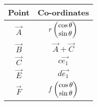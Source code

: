 \begin{tabular}{|c|c|}
\hline
Point & Co-ordinates\\
\hline
$\vec{A}$ & $r\begin{pmatrix}\cos{\theta}\\\sin{\theta}\end{pmatrix}$ \\
\hline
$\vec{B}$ & $\vec{A} + \vec{C}$ \\
\hline
$\vec{C}$ & $c\vec{e_1}$\\
\hline
$\vec{E}$ & $d\vec{e_1}$ \\
\hline
$\vec{F}$ & $f\begin{pmatrix}\cos{\theta}\\\sin{\theta}\end{pmatrix}$ \\
\hline
\end{tabular}
